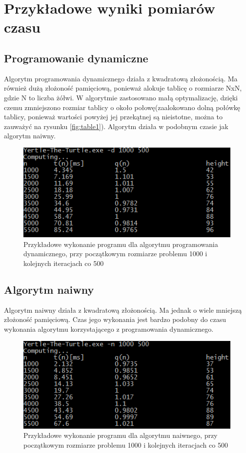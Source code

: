 \documentclass[11pt,a4paper]{article}
\begin{document}
\section{Przykładowe wyniki pomiarów czasu}
\subsection{Programowanie dynamiczne}
Algorytm programowania dynamicznego działa z kwadratową złożonością. Ma również dużą złożoność pamięciową, ponieważ alokuje tablicę o rozmiarze NxN, gdzie N to liczba żółwi. W algorytmie zastosowano małą optymalizację, dzięki czemu zmniejszono rozmiar tablicy o około połowę(zaalokowano dolną połówkę tablicy, ponieważ wartości powyżej jej przekątnej są nieistotne, można to zauważyć na rysunku \ref{fig:table1}). Algorytm działa w podobnym czasie jak algorytm naiwny.

\begin{figure}[h]
  \centering
  \includegraphics[scale=1.25]{yertleD.png}
  \caption{Przykładowe wykonanie programu dla algorytmu programowania dynamicznego, przy początkowym rozmiarze problemu 1000 i kolejnych iteracjach co 500 }
  \label{fig:yertleD}
\end{figure}

\newpage
\subsection{Algorytm naiwny}
Algorytm naiwny działa z kwadratową złożonością. Ma jednak o wiele mniejszą złożoność pamięciową. Czas jego wykonania jest bardzo podobny do czasu wykonania algorytmu korzystającego z programowania dynamicznego.

\begin{figure}[h]
  \centering
  \includegraphics[scale=1.25]{yertleN.png}
  \caption{Przykładowe wykonanie programu dla algorytmu naiwnego, przy początkowym rozmiarze problemu 1000 i kolejnych iteracjach co 500 }
  \label{fig:yertleN}
\end{figure}
\end{document}
